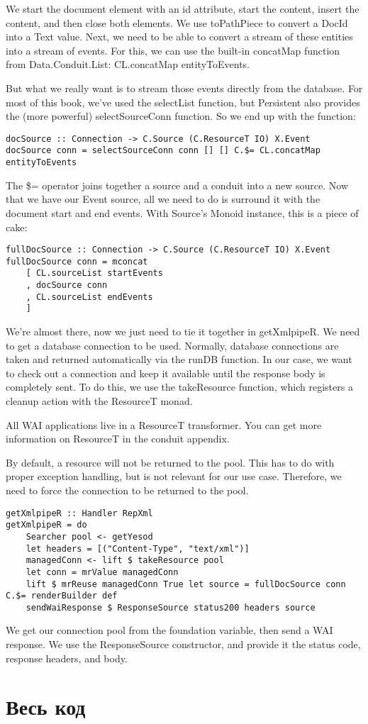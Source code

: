 We start the document element with an id attribute, start the content, insert the content, and then close both elements. We use toPathPiece to convert a DocId into a Text value. Next, we need to be able to convert a stream of these entities into a stream of events. For this, we can use the built-in concatMap function from Data.Conduit.List: CL.concatMap entityToEvents.

But what we really want is to stream those events directly from the database. For most of this book, we've used the selectList function, but Persistent also provides the (more powerful) selectSourceConn function. So we end up with the function:

\begin{lstlisting}
docSource :: Connection -> C.Source (C.ResourceT IO) X.Event
docSource conn = selectSourceConn conn [] [] C.$= CL.concatMap entityToEvents
\end{lstlisting}%

The \$= operator joins together a source and a conduit into a new source. Now that we have our Event source, all we need to do is surround it with the document start and end events. With Source's Monoid instance, this is a piece of cake:

\begin{lstlisting}
fullDocSource :: Connection -> C.Source (C.ResourceT IO) X.Event
fullDocSource conn = mconcat
    [ CL.sourceList startEvents
    , docSource conn
    , CL.sourceList endEvents
    ]
\end{lstlisting}

We're almost there, now we just need to tie it together in getXmlpipeR. We need to get a database connection to be used. Normally, database connections are taken and returned automatically via the runDB function. In our case, we want to check out a connection and keep it available until the response body is completely sent. To do this, we use the takeResource function, which registers a cleanup action with the ResourceT monad.

All WAI applications live in a ResourceT transformer. You can get more information on ResourceT in the conduit appendix.

By default, a resource will not be returned to the pool. This has to do with proper exception handling, but is not relevant for our use case. Therefore, we need to force the connection to be returned to the pool.

\begin{lstlisting}
getXmlpipeR :: Handler RepXml
getXmlpipeR = do
    Searcher pool <- getYesod
    let headers = [("Content-Type", "text/xml")]
    managedConn <- lift $ takeResource pool
    let conn = mrValue managedConn
    lift $ mrReuse managedConn True let source = fullDocSource conn C.$= renderBuilder def
    sendWaiResponse $ ResponseSource status200 headers source
\end{lstlisting}

We get our connection pool from the foundation variable, then send a WAI response. We use the ResponseSource constructor, and provide it the status code, response headers, and body.

\section{Весь код} %


